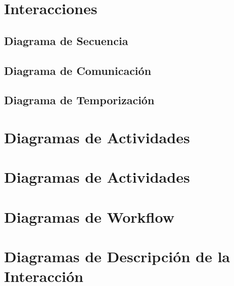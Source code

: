 \section{Interacciones}

\newpage

\subsection{Diagrama de Secuencia}

\newpage

\subsection{Diagrama de Comunicación}

\newpage

\subsection{Diagrama de Temporización}

\newpage

\section{Diagramas de Actividades}

\newpage

\section{Diagramas de Actividades}

\newpage

\section{Diagramas de Workflow}

\newpage

\section{Diagramas de Descripción de la Interacción}

\newpage